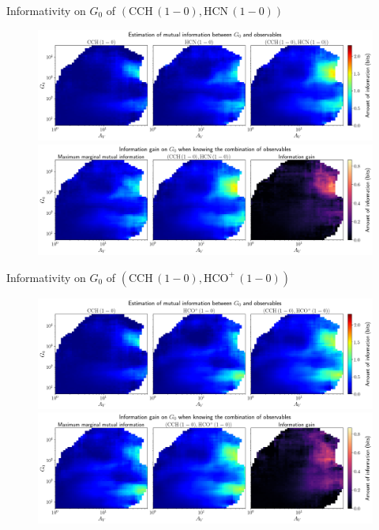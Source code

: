 \documentclass{beamer}
\begin{document}
\begin{frame}{Informativity on $G_0$ of $\left(\mathrm{CCH\,(1-0)},\mathrm{HCN\,(1-0)}\right)$}
    \begin{figure}
        \centering
        \includegraphics[width=0.95\linewidth]{../mi/g0__cch10_hcn10_mi.png}
        \vfill
        \includegraphics[width=0.95\linewidth]{../mi/g0__cch10_hcn10_mi_gain.png}
    \end{figure}
\end{frame}

\begin{frame}{Informativity on $G_0$ of $\left(\mathrm{CCH\,(1-0)},\mathrm{HCO^+\,(1-0)}\right)$}
    \begin{figure}
        \centering
        \includegraphics[width=0.95\linewidth]{../mi/g0__cch10_hcop10_mi.png}
        \vfill
        \includegraphics[width=0.95\linewidth]{../mi/g0__cch10_hcop10_mi_gain.png}
    \end{figure}
\end{frame}
\end{document}
